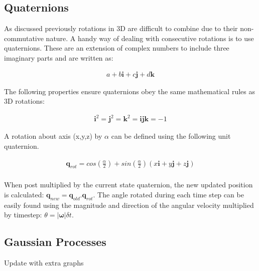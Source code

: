 \documentclass[twoside,twocolumn,12pt]{article}
\begin{document}
\subsection{Quaternions}
As discussed previously rotations in 3D are difficult to combine due to their non-commutative nature. A handy way of dealing with consecutive rotations is to use quaternions. These are an extension of complex numbers to include three imaginary parts and are written as:

\begin{align*}
a + b\textbf{i} + c\textbf{j} + d\textbf{k}
\end{align*}

The following properties ensure quaternions obey the same mathematical rules as 3D rotations:

\begin{align*}
\textbf{i}^2 = \textbf{j}^2 = \textbf{k}^2 = \textbf{ijk} = -1
\end{align*}

A rotation about axis (x,y,z) by $\alpha$ can be defined using the following unit quaternion. 

\begin{gather}
\textbf{q}_{rot} = cos(\frac{\alpha}{2}) + sin(\frac{\alpha}{2})(x\textbf{i} + y\textbf{j} + z\textbf{j}) \nonumber \\
\end{gather}

When post multiplied by the current state quaternion, the new updated position is calculated: $\textbf{q}_{new} = \textbf{q}_{old} . \textbf{q}_{rot}$.
\newline
The angle rotated during each time step can be easily found using the magnitude and direction of the angular velocity multiplied by timestep: $ \theta = | \boldsymbol{\omega} |\delta t$.  \cite{arsalan}
\subsection{Gaussian Processes}
\color{red}
 Update with extra graphs
 \color{black}
 
\end{document}

